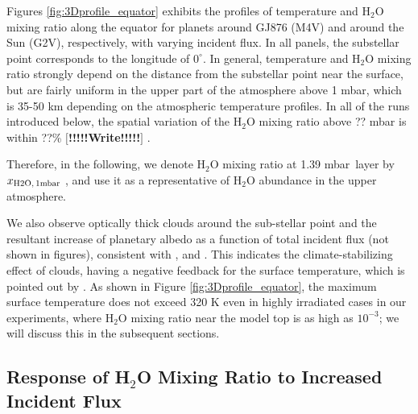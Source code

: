 \documentclass[11pt,numberedappendix,twocolappendix,]{emulateapj}
\def\water{H$_2$O }
\def\xwater{$x_{\rm H2O,\,1mbar}$ }
\def\preslevel{1.39 mbar\ }
\def\memo#1{\color{red}$[${\bf #1}$]$ \color{black}}
\begin{document}
Figures \ref{fig:3Dprofile_equator} exhibits the profiles of temperature and \water mixing ratio along the equator for planets around GJ876 (M4V) and around the Sun (G2V), respectively, with varying incident flux. 
In all panels, the substellar point corresponds to the longitude of $0^{\circ }$. 
In general, temperature and \water mixing ratio strongly depend on the distance from the substellar point near the surface, but are fairly uniform in the upper part of the atmosphere above 1 mbar, which is 35-50 km depending on the atmospheric temperature profiles. 
In all of the runs introduced below, the spatial variation of the \water mixing ratio above ?? mbar is within ??\% 
\memo{!!!!!Write!!!!!}. 

Therefore, in the following, we denote \water mixing ratio at \preslevel layer by \xwater, and use it as a representative of \water abundance in the upper atmosphere. 



We also observe optically thick clouds around the sub-stellar point and the resultant increase of planetary albedo as a function of total incident flux (not shown in figures), consistent with \citet{Yang2013,Yang2014}, \citet{Kopparapu2016} and \citet{Way2016}. 
This indicates the climate-stabilizing effect of clouds, having a negative feedback for the surface temperature, which is pointed out by \citet{Yang2013}. 
As shown in Figure \ref{fig:3Dprofile_equator}, the maximum surface temperature does not exceed 320 K even in highly irradiated cases in our experiments, where \water mixing ratio near the model top is as high as $10^{-3}$; we will discuss this in the subsequent sections. 


\subsection{Response of \water Mixing Ratio to Increased Incident Flux}
\label{ss:result_H2Omixingratio}
\end{document}
